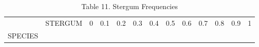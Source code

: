 \begin{longtable}[]{@{}lcccccccccccc@{}}
\caption{Table 11. Stergum Frequencies}\tabularnewline
\toprule
\begin{minipage}[t]{0.08\columnwidth}\raggedright\strut
\strut
\end{minipage} & \begin{minipage}[t]{0.08\columnwidth}\centering\strut
STERGUM\strut
\end{minipage} & \begin{minipage}[t]{0.03\columnwidth}\centering\strut
0\strut
\end{minipage} & \begin{minipage}[t]{0.05\columnwidth}\centering\strut
0.1\strut
\end{minipage} & \begin{minipage}[t]{0.05\columnwidth}\centering\strut
0.2\strut
\end{minipage} & \begin{minipage}[t]{0.05\columnwidth}\centering\strut
0.3\strut
\end{minipage} & \begin{minipage}[t]{0.05\columnwidth}\centering\strut
0.4\strut
\end{minipage} & \begin{minipage}[t]{0.05\columnwidth}\centering\strut
0.5\strut
\end{minipage} & \begin{minipage}[t]{0.05\columnwidth}\centering\strut
0.6\strut
\end{minipage} & \begin{minipage}[t]{0.05\columnwidth}\centering\strut
0.7\strut
\end{minipage} & \begin{minipage}[t]{0.05\columnwidth}\centering\strut
0.8\strut
\end{minipage} & \begin{minipage}[t]{0.05\columnwidth}\centering\strut
0.9\strut
\end{minipage} & \begin{minipage}[t]{0.05\columnwidth}\centering\strut
1\strut
\end{minipage}\tabularnewline
\begin{minipage}[t]{0.08\columnwidth}\raggedright\strut
SPECIES\strut
\end{minipage} & \begin{minipage}[t]{0.08\columnwidth}\centering\strut
\strut
\end{minipage} & \begin{minipage}[t]{0.03\columnwidth}\centering\strut

\end{minipage}
\end{longtable}

